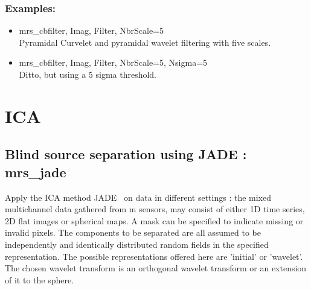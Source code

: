 \subsubsection*{Examples:} 
\begin{itemize}
\item mrs\_cbfilter, Imag, Filter, NbrScale=5 \\
Pyramidal Curvelet and pyramidal wavelet filtering with five scales.
\item mrs\_cbfilter, Imag, Filter, NbrScale=5, Nsigma=5 \\
Ditto, but using a 5 sigma threshold.
\end{itemize}



\section{ICA}


\subsection{Blind source separation using JADE : mrs\_jade}

Apply the ICA method JADE~\cite{ica:jade} on data in different settings : the mixed multichannel data gathered from m sensors, 
may consist of either 1D time series, 2D flat images or spherical maps. A mask can be specified to indicate missing or invalid 
pixels. The components to be separated are all assumed to be independently and identically distributed random fields in the 
specified representation. The possible representations offered here are 'initial' or 'wavelet'. The chosen wavelet transform 
is an orthogonal wavelet transform or an extension of it to the sphere.

